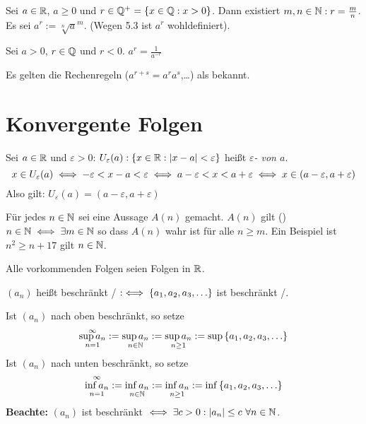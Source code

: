 \documentclass[a4paper,twoside,DIV15,BCOR12mm]{scrbook}
\begin{document}
\begin{definition}
\begin{liste}
\item Sei $a \in \mathbb{R}$, $a \ge 0 $ und $r \in \mathbb{Q}^+ = \{ x \in \mathbb{Q}: x>0\}$. Dann existiert $m,n \in \mathbb{N}: r = \frac{m}{n}$.  Es sei $a^r := \sqrt[n]{a}^m$. (Wegen 5.3 ist $a^r$ wohldefiniert).
\item Sei $a>0$, $r\in\mathbb{Q}$ und $r < 0$. $a^r = \frac{1}{a^{-r}} $
\end{liste}
\end{definition}

Es gelten die Rechenregeln ($a^{r+s} = a^r a^s$,\ldots) als bekannt.

\chapter{Konvergente Folgen}

\begin{definition}[Umgebung]
Sei $a \in \mathbb{R}$ und $\varepsilon > 0$: $U_\varepsilon(a):\{x \in \mathbb{R}: |x-a|<\varepsilon\}$ heißt \textit{$\varepsilon$- von $a$}. \\
$$ x \in U_\varepsilon(a) \iff -\varepsilon < x - a < \varepsilon \iff a - \varepsilon < x < a +  \varepsilon \iff x \in (a-\varepsilon, a+\varepsilon) $$
Also gilt: $U_\varepsilon(a) = (a-\varepsilon, a+\varepsilon)$
\end{definition}

\begin{definition}
Für jedes $n \in \mathbb{N}$ sei eine Aussage $A(n)$ gemacht. $A(n)$ gilt  (\ffa) $n \in \mathbb{N} \iff \exists m \in \mathbb{N} $ so dass $A(n)$ wahr ist für alle $n \ge m$. Ein Beispiel ist $n^2\ge n + 17$ gilt \ffa $n \in \mathbb{N}$.
\end{definition}

\begin{vereinbarung}
Alle vorkommenden Folgen seien Folgen in $\mathbb{R}$.
\end{vereinbarung}

\begin{definition}
$(a_n)$ heißt beschränkt / $:\iff \{a_1,a_2,a_3,\ldots\}$ ist beschränkt /.

Ist $(a_n)$ nach oben beschränkt, so setze
$$ \mathop{\sup{a_n}}_{n=1}^{\infty} := \mathop{\sup{a_n}}_{n\in \mathbb{N}} := \mathop{\sup{a_n}}_{n \ge 1} := \sup{\{a_1,a_2,a_3,\ldots\}}$$
Ist $(a_n)$ nach unten beschränkt, so setze
$$ \mathop{\inf{a_n}}_{n=1}^{\infty} := \mathop{\inf{a_n}}_{n\in \mathbb{N}} := \mathop{\inf{a_n}}_{n \ge 1} := \inf{\{a_1,a_2,a_3,\ldots\}}$$
\textbf{Beachte:} $(a_n)$ ist beschränkt $\iff \exists c > 0 : |a_n| \le c \ \forall n \in \mathbb{N}$.
\end{definition}
\end{document}
